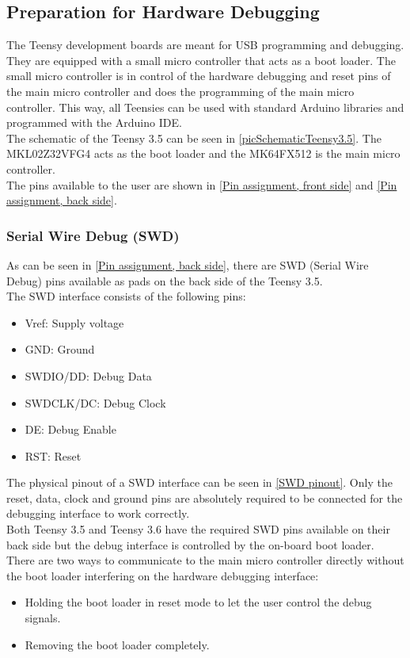 \subsection{Preparation for Hardware Debugging}
The Teensy development boards are meant for USB programming and debugging. They are equipped with a small micro controller that acts as a boot loader. The small micro controller is in control of the hardware debugging and reset pins of the main micro controller and does the programming of the main micro controller. This way, all Teensies can be used with standard Arduino libraries and programmed with the Arduino IDE. \\
The schematic of the Teensy 3.5 can be seen in \autoref{picSchematicTeensy3.5}. The MKL02Z32VFG4 acts as the boot loader and the MK64FX512 is the main micro controller.\\
The pins available to the user are shown in \autoref{Pin assignment, front side} and \autoref{Pin assignment, back side}. \\
%
\subsubsection{Serial Wire Debug (SWD)}
As can be seen in \autoref{Pin assignment, back side}, there are SWD (Serial Wire Debug) pins available as pads on the back side of the Teensy 3.5.\\
The SWD interface consists of the following pins:
\begin{itemize}
    \item Vref: Supply voltage
    \item GND: Ground
    \item SWDIO/DD: Debug Data
    \item SWDCLK/DC: Debug Clock
    \item DE: Debug Enable
    \item RST: Reset
\end{itemize}
The physical pinout of a SWD interface can be seen in \autoref{SWD pinout}. Only the reset, data, clock and ground pins are absolutely required to be connected for the debugging interface to work correctly.\\
Both Teensy 3.5 and Teensy 3.6 have the required SWD pins available on their back side but the debug interface is controlled by the on-board boot loader. \\
There are two ways to communicate to the main micro controller directly without the boot loader interfering on the hardware debugging interface:
\begin{itemize}
    \item Holding the boot loader in reset mode to let the user control the debug signals.
    \item Removing the boot loader completely.
\end{itemize}
